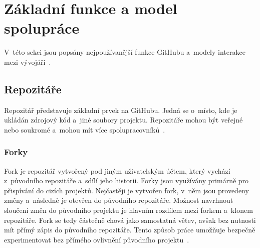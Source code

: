
\section{Základní funkce a model spolupráce}
\label{sec:github:zakladni_funkce_model_spoluprace}
V~této sekci jsou popsány nejpoužívanější funkce GitHubu a~modely interakce mezi vývojáři~\cite{github_docs}.

\subsection{Repozitáře}
\label{subsec:github:repozitare}
Repozitář představuje základní prvek na GitHubu. Jedná se o~místo, kde je ukládán zdrojový kód a~jiné soubory projektu. Repozitáře mohou být veřejné nebo soukromé a~mohou mít více spolupracovníků~\cite{github_docs}.

\subsubsection*{Forky}
\label{subsubsec:github:forky}
Fork je repozitář vytvořený pod jiným uživatelským účtem, který vychází z~původního repozitáře a~sdílí jeho historii. Forky jsou využívány primárně pro přispívání do cizích projektů. Nejčastěji je vytvořen fork, v~něm jsou provedeny změny a~následně je otevřen \PR do původního repozitáře. Možnost navrhnout sloučení změn do původního projektu je hlavním rozdílem mezi forkem a~klonem repozitáře. Fork se tedy částečně chová jako samostatná větev, avšak bez nutnosti mít přímý zápis do původního repozitáře. Tento způsob práce umožňuje bezpečně experimentovat bez přímého ovlivnění původního projektu~\cite{github_pull_requests_docs}.

